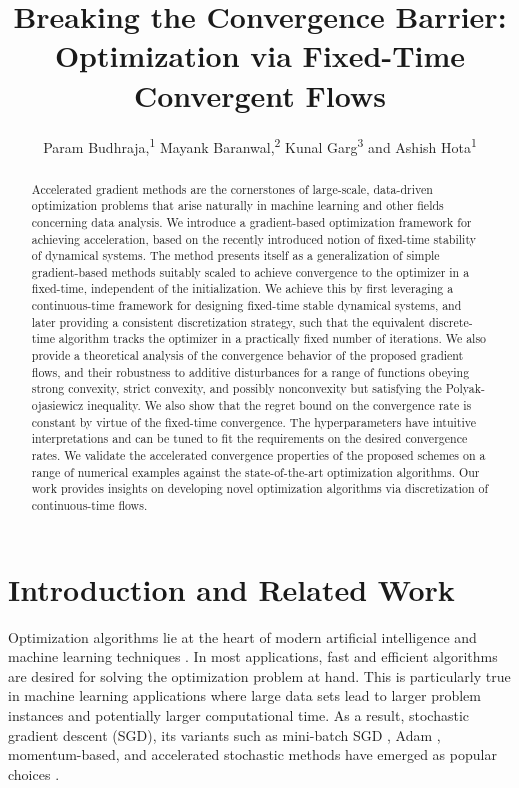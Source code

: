 \documentclass[letterpaper]{article}
\title{Breaking the Convergence Barrier: Optimization via Fixed-Time Convergent Flows}
\author {
    Param Budhraja\equalcontrib,\textsuperscript{\rm 1}
    Mayank Baranwal\equalcontrib,\textsuperscript{\rm 2}
    Kunal Garg\textsuperscript{\rm 3} {\normalfont and}
    Ashish Hota\textsuperscript{\rm 1}
}
\begin{document}
\maketitle
\begin{abstract}
Accelerated gradient methods are the cornerstones of large-scale, data-driven optimization problems that arise naturally in machine learning and other fields concerning data analysis. We introduce a gradient-based optimization framework for achieving acceleration, based on the recently introduced notion of fixed-time stability of dynamical systems. The method presents itself as a generalization of simple gradient-based methods suitably scaled to achieve convergence to the optimizer in a fixed-time, independent of the initialization. We achieve this by first leveraging a continuous-time framework for designing fixed-time stable dynamical systems, and later providing a consistent discretization strategy, such that the equivalent discrete-time algorithm tracks the optimizer in a practically fixed number of iterations. We also provide a theoretical analysis of the convergence behavior of the proposed gradient flows, and their robustness to additive disturbances for a range of functions obeying strong convexity, strict convexity, and possibly nonconvexity but satisfying the Polyak-ojasiewicz inequality. We also show that the regret bound on the convergence rate is constant by virtue of the fixed-time convergence. The hyperparameters have intuitive interpretations and can be tuned to fit the requirements on the desired convergence rates. We validate the accelerated convergence properties of the proposed schemes on a range of numerical examples against the state-of-the-art optimization algorithms. Our work provides insights on developing novel optimization algorithms via discretization of continuous-time flows.
\end{abstract}


\section{Introduction and Related Work} \label{sec: Intro}

Optimization algorithms lie at the heart of modern artificial intelligence and machine learning techniques \cite{sra2012optimization}. In most applications, fast and efficient algorithms are desired for solving the optimization problem at hand. This is particularly true in machine learning applications where large data sets lead to larger problem instances and potentially larger computational time. As a result, stochastic gradient descent (SGD), its variants such as mini-batch SGD \cite{shalev2014understanding}, Adam \cite{kingma2015adam}, momentum-based, and accelerated stochastic methods have emerged as popular choices \cite{huo2018accelerated, li2020accelerated}.
\end{document}
